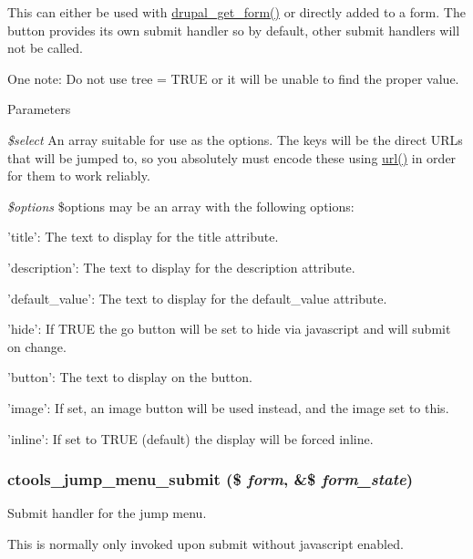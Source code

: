 This can either be used with \hyperlink{group__form__api_ga720df81a837b06dfe19daf1c1eea3437}{drupal\_\-get\_\-form()} or directly added to a form. The button provides its own submit handler so by default, other submit handlers will not be called.

One note: Do not use tree = TRUE or it will be unable to find the proper value.





\begin{DoxyParams}{Parameters}
\item[{\em \$select}]An array suitable for use as the options. The keys will be the direct URLs that will be jumped to, so you absolutely must encode these using \hyperlink{common_8inc_a43b2a0594431556db49df980801d8807}{url()} in order for them to work reliably.\item[{\em \$options}]\$options may be an array with the following options:
\begin{DoxyItemize}
\item 'title': The text to display for the title attribute.
\item 'description': The text to display for the description attribute.
\item 'default\_\-value': The text to display for the default\_\-value attribute.
\item 'hide': If TRUE the go button will be set to hide via javascript and will submit on change.
\item 'button': The text to display on the button.
\item 'image': If set, an image button will be used instead, and the image set to this.
\item 'inline': If set to TRUE (default) the display will be forced inline. 
\end{DoxyItemize}\end{DoxyParams}
\hypertarget{jump-menu_8inc_a68fece12f8d911934a1ffb41f0e30188}{
\subsubsection[{ctools\_\-jump\_\-menu\_\-submit}]{\setlength{\rightskip}{0pt plus 5cm}ctools\_\-jump\_\-menu\_\-submit (\$ {\em form}, \/  \&\$ {\em form\_\-state})}}
\label{jump-menu_8inc_a68fece12f8d911934a1ffb41f0e30188}
Submit handler for the jump menu.

This is normally only invoked upon submit without javascript enabled. 